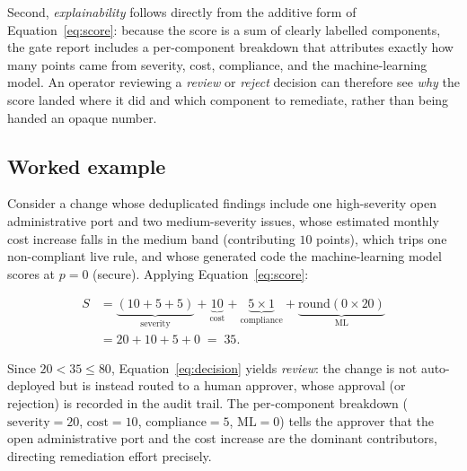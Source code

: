 Second, \emph{explainability} follows directly from the additive form of
Equation~\ref{eq:score}: because the score is a sum of clearly labelled components, the
gate report includes a per-component breakdown that attributes exactly how many points
came from severity, cost, compliance, and the machine-learning model. An operator
reviewing a \emph{review} or \emph{reject} decision can therefore see \emph{why} the
score landed where it did and which component to remediate, rather than being handed an
opaque number.

\subsection{Worked example}
\label{subsec:rs-example}

Consider a change whose deduplicated findings include one high-severity open
administrative port and two medium-severity issues, whose estimated monthly cost increase
falls in the medium band (contributing $10$ points), which trips one non-compliant live
rule, and whose generated code the machine-learning model scores at $p = 0$ (secure).
Applying Equation~\ref{eq:score}:

\begin{align*}
S &= \underbrace{(10 + 5 + 5)}_{\text{severity}}
   + \underbrace{10}_{\text{cost}}
   + \underbrace{5 \times 1}_{\text{compliance}}
   + \underbrace{\mathrm{round}(0 \times 20)}_{\text{ML}} \\
  &= 20 + 10 + 5 + 0 \;=\; 35.
\end{align*}

Since $20 < 35 \le 80$, Equation~\ref{eq:decision} yields \emph{review}: the change is not
auto-deployed but is instead routed to a human approver, whose approval (or rejection) is
recorded in the audit trail. The per-component breakdown ($\text{severity}=20$,
$\text{cost}=10$, $\text{compliance}=5$, $\text{ML}=0$) tells the approver that the open
administrative port and the cost increase are the dominant contributors, directing
remediation effort precisely.
